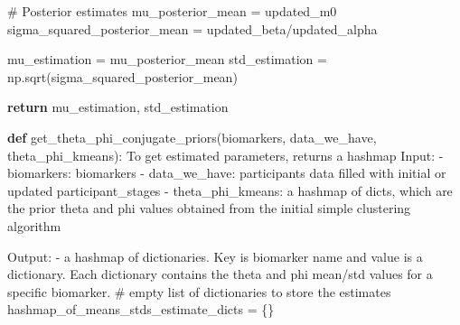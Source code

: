 \documentclass[
  letterpaper,
  DIV=11,
  numbers=noendperiod]{scrreprt}
\newenvironment{Shaded}{\begin{snugshade}}{\end{snugshade}}
\newcommand{\CommentTok}[1]{\textcolor[rgb]{0.37,0.37,0.37}{#1}}
\newcommand{\ControlFlowTok}[1]{\textcolor[rgb]{0.00,0.23,0.31}{\textbf{#1}}}
\newcommand{\KeywordTok}[1]{\textcolor[rgb]{0.00,0.23,0.31}{\textbf{#1}}}
\newcommand{\NormalTok}[1]{\textcolor[rgb]{0.00,0.23,0.31}{#1}}
\newcommand{\OperatorTok}[1]{\textcolor[rgb]{0.37,0.37,0.37}{#1}}
\begin{document}
\begin{Shaded}
\begin{Highlighting}[]
    \CommentTok{\# Posterior estimates}
\NormalTok{    mu\_posterior\_mean }\OperatorTok{=}\NormalTok{ updated\_m0}
\NormalTok{    sigma\_squared\_posterior\_mean }\OperatorTok{=}\NormalTok{ updated\_beta}\OperatorTok{/}\NormalTok{updated\_alpha}

\NormalTok{    mu\_estimation }\OperatorTok{=}\NormalTok{ mu\_posterior\_mean}
\NormalTok{    std\_estimation }\OperatorTok{=}\NormalTok{ np.sqrt(sigma\_squared\_posterior\_mean)}

    \ControlFlowTok{return}\NormalTok{ mu\_estimation, std\_estimation}

\KeywordTok{def}\NormalTok{ get\_theta\_phi\_conjugate\_priors(biomarkers, data\_we\_have, theta\_phi\_kmeans):}
    \CommentTok{\textquotesingle{}\textquotesingle{}\textquotesingle{}To get estimated parameters, returns a hashmap}
\CommentTok{    Input:}
\CommentTok{    {-} biomarkers: biomarkers }
\CommentTok{    {-} data\_we\_have: participants data filled with initial or updated participant\_stages}
\CommentTok{    {-} theta\_phi\_kmeans: a hashmap of dicts, which are the prior theta and phi values}
\CommentTok{        obtained from the initial simple clustering algorithm}

\CommentTok{    Output: }
\CommentTok{    {-} a hashmap of dictionaries. Key is biomarker name and value is a dictionary.}
\CommentTok{    Each dictionary contains the theta and phi mean/std values for a specific biomarker. }
\CommentTok{    \textquotesingle{}\textquotesingle{}\textquotesingle{}}
    \CommentTok{\# empty list of dictionaries to store the estimates}
\NormalTok{    hashmap\_of\_means\_stds\_estimate\_dicts }\OperatorTok{=}\NormalTok{ \{\}}


\end{Highlighting}
\end{Shaded}
\end{document}
